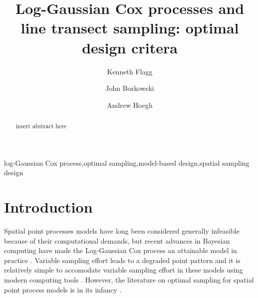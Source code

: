 \documentclass[review]{elsarticle}
\begin{document}
\begin{frontmatter}

\title{Log-Gaussian Cox processes and line transect sampling: optimal design critera}

\author[msuaddr]{Kenneth Flagg}

\author[msuaddr]{John Borkowski}
\author[msuaddr]{Andrew Hoegh}

\address[msuaddr]{Department of Mathematical Sciences, Montana State University, Bozeman, MT 59717}

\begin{abstract}

\noindent insert abstract here

\end{abstract}

\begin{keyword}
log-Gaussian Cox process\sep optimal sampling\sep model-based design\sep spatial sampling design
\end{keyword}

\end{frontmatter}

\linenumbers

\section{Introduction}


Spatial point processes models have long been considered generally infeasible
because of their computational demands, but recent advances in Bayesian
computing have made the Log-Gaussian Cox process an attainable model in
practice \citep{rueetal, lindgrenetal, illianetal, simpsonetal}. Variable
sampling effort leads to a degraded point pattern \cite{chakrabortyetal} and
it is relatively simple to accomodate variable sampling effort in these models
using modern computing tools \citep{yuanetal}. However, the literature on
optimal sampling for spatial point process models is in its infancy
\citep{liuvanhatalo}.
\end{document}
